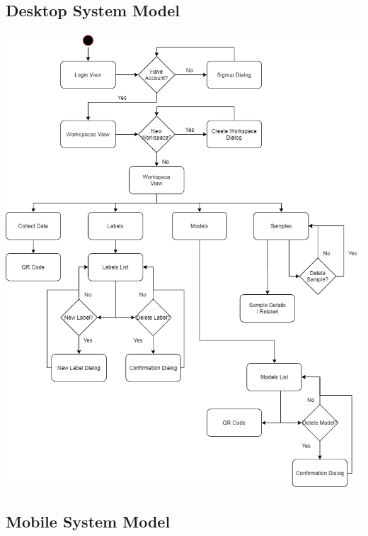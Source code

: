 \subsection{Desktop System Model}
\begin{center}
    \includegraphics[width=\textwidth,height=0.85\textheight,keepaspectratio]{charts/flow1.png}
\end{center}

\newpage

\subsection{Mobile System Model}
\vspace{1cm}

